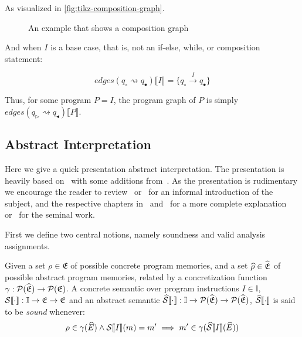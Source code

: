 As visualized in \autoref{fig:tikz-composition-graph}.

\begin{figure}
    \center
    
    \caption{An example that shows a composition graph}
    \label{fig:tikz-composition-graph}
\end{figure}

And when $I$ is a base case, that is, not an if-else, while, or composition statement:

\begin{equation}
    edges(q_\circ \rightsquigarrow q_\bullet) \llbracket I \rrbracket = \{q_\circ \xrightarrow{I} q_\bullet\}\label{eq:equation11}
\end{equation}

Thus, for some program $P = I$, the program graph of $P$ is simply $edges(q_\triangleright \rightsquigarrow q_\blacktriangleleft)\llbracket P \rrbracket$.

\subsection{Abstract Interpretation}\label{subsec:abstract-interpretation}

Here we give a quick presentation abstract interpretation.
The presentation is heavily based on~\cite{nielson_formal_2019} with some additions from~\cite{moller_statitc_nodate}.
As the presentation is rudimentary we encourage the reader to review~\cite{noauthor_abstract_nodate} or~\cite{cousot_abstract_1996} for an informal introduction of the subject, and the respective chapters in~\cite{nielson_formal_2019} and~\cite{moller_statitc_nodate} for a more complete explanation or~\cite{cousot_abstract_1977} for the seminal work.

First we define two central notions, namely soundness and valid analysis assignments.

\begin{definition}
    Given a set $\rho \in \mathfrak{E}$ of possible concrete program memories, and a set $\widehat{\rho} \in \widehat{\mathfrak{E}}$ of possible abstract program memories, related by a concretization function $\gamma : \mathcal{P}(\widehat{\mathfrak{E}}) \rightarrow \mathcal{P}(\mathfrak{E})$.
    A concrete semantic over program instructions $I \in \mathbb{I}$, $\mathcal{S} \llbracket \cdot \rrbracket : \mathbb{I} \rightarrow \mathfrak{E} \rightarrow \mathfrak{E}$ and an abstract semantic $\widehat{\mathcal{S}} \llbracket \cdot \rrbracket : \mathbb{I} \rightarrow \mathcal{P}(\widehat{\mathfrak{E}}) \rightarrow \mathcal{P}(\widehat{\mathfrak{E}})$, $\widehat{\mathcal{S}} \llbracket \cdot \rrbracket$ is said to be \emph{sound} whenever:
    \begin{equation}
        \rho \in \concrete(\ab{E}) \land \sem{I}(m) = m' \implies m' \in \concrete(\abssem{I}(\ab{E}))\label{eq:equation12}
    \end{equation}
\end{definition}

